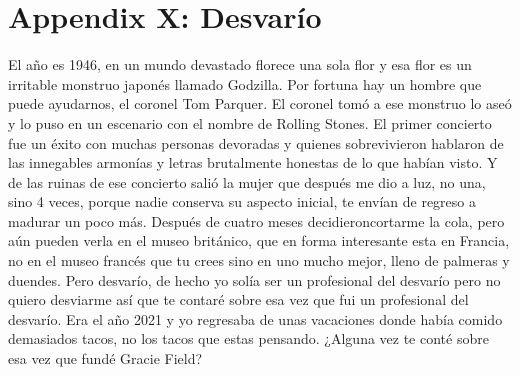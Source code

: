 \chapter{Appendix X: Desvar\'io}

El año es 1946, en un mundo devastado florece una sola flor y esa flor es un irritable monstruo japonés llamado Godzilla. Por fortuna hay un hombre que puede ayudarnos, el coronel Tom Parquer. El coronel tomó a ese monstruo lo aseó y lo puso en un escenario con el nombre de Rolling Stones. El primer concierto fue un éxito con muchas personas devoradas y quienes sobrevivieron hablaron de las innegables armonías y letras brutalmente honestas de lo que habían visto. Y de las ruinas de ese concierto salió la mujer que después me dio a luz, no una, sino 4 veces, porque nadie conserva su aspecto inicial, te envían de regreso a madurar un poco más. Después de cuatro meses decidieroncortarme la cola, pero aún pueden verla en el museo británico, que en forma interesante esta en Francia, no en el museo francés que tu crees sino en uno mucho mejor, lleno de palmeras y duendes. Pero desvarío, de hecho yo solía ser un profesional del desvarío pero no quiero desviarme así que te contaré sobre esa vez que fui un profesional del desvarío. Era el año 2021 y yo regresaba de unas vacaciones donde había comido demasiados tacos, no los tacos que estas pensando. ¿Alguna vez te conté sobre esa vez que fundé Gracie Field?
